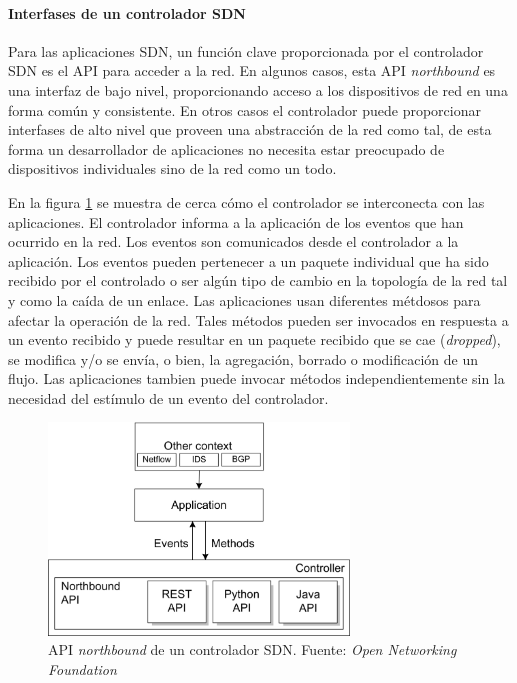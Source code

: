 \documentclass[10pt,journal,compsoc]{IEEEtran}
\begin{document}
\paragraph{Interfases de un controlador SDN}
Para las aplicaciones SDN, un función clave proporcionada por el controlador SDN es el API para acceder a la red. En algunos casos, esta API \emph{northbound} es una interfaz de bajo nivel, proporcionando acceso a los dispositivos de red en una forma común y consistente. En otros casos el controlador puede proporcionar interfases de alto nivel que proveen una abstracción de la red como tal, de esta forma un desarrollador de aplicaciones no necesita estar preocupado de dispositivos individuales sino de la red como un todo.

En la figura \ref{fig:sdn-controlador-2} se muestra de cerca cómo el controlador se interconecta con las aplicaciones. El controlador informa a la aplicación de los eventos que han ocurrido en la red. Los eventos son comunicados desde el controlador a la aplicación. Los eventos pueden pertenecer a un paquete individual que ha sido recibido por el controlado o ser algún tipo de cambio en la topología de la red tal y como la caída de un enlace. Las aplicaciones usan diferentes métdosos para afectar la operación de la red. Tales métodos pueden ser invocados en respuesta a un evento recibido y puede resultar en un paquete recibido que se cae (\emph{dropped}), se modifica y/o se envía, o bien, la agregación, borrado o modificación de un flujo. Las aplicaciones tambien puede invocar métodos independientemente sin la necesidad del estímulo de un evento del controlador.

\begin{figure}[h]
    \centering
    \includegraphics[width=8cm]{controller-2}
    \caption{API \emph{northbound} de un controlador SDN. Fuente: \emph{Open Networking Foundation}}
    \label{fig:sdn-controlador-2}
\end{figure}
\end{document}
